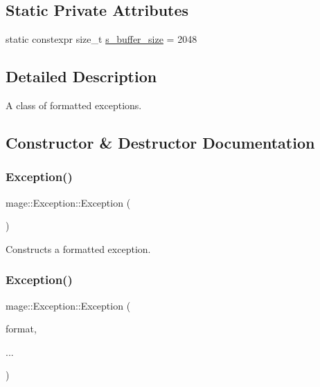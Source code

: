 \subsection*{Static Private Attributes}
\begin{DoxyCompactItemize}
\item 
static constexpr size\+\_\+t \mbox{\hyperlink{classmage_1_1_exception_a41c9eb8e4a238210822170dfa211e493}{s\+\_\+buffer\+\_\+size}} = 2048
\end{DoxyCompactItemize}


\subsection{Detailed Description}
A class of formatted exceptions. 

\subsection{Constructor \& Destructor Documentation}
\mbox{\label{classmage_1_1_exception_a87fd5f6c5465c01244020afbaebdb9f5}} 
\subsubsection{\texorpdfstring{Exception()}{Exception()}\hspace{0.1cm}{\footnotesize\ttfamily [1/5]}}
{\footnotesize\ttfamily mage\+::\+Exception\+::\+Exception (\begin{DoxyParamCaption}{ }\end{DoxyParamCaption})}

Constructs a formatted exception. \mbox{\label{classmage_1_1_exception_ace796ee1ef1e8969b043cd0b3f0b23e0}} 
\subsubsection{\texorpdfstring{Exception()}{Exception()}\hspace{0.1cm}{\footnotesize\ttfamily [2/5]}}
{\footnotesize\ttfamily mage\+::\+Exception\+::\+Exception (\begin{DoxyParamCaption}\item[{\mbox{\hyperlink{namespacemage_a8769f9d670d6b585ea306cb1062af94b}{Not\+Null}}$<$ \mbox{\hyperlink{namespacemage_abfd9206dc607ceb5d13ec68bf075a5c0}{const\+\_\+zstring}} $>$}]{format,  }\item[{}]{... }\end{DoxyParamCaption})\hspace{0.3cm}{\ttfamily [explicit]}}

